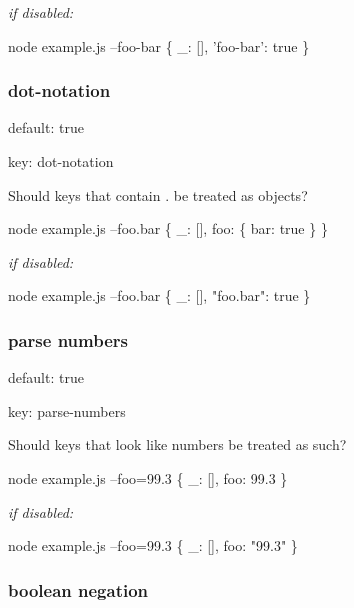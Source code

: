 {\itshape if disabled\+:}


\begin{DoxyCode}
node example.js --foo-bar
\{ \_: [], 'foo-bar': true \}
\end{DoxyCode}


\subsubsection*{dot-\/notation}


\begin{DoxyItemize}
\item default\+: {\ttfamily true}
\item key\+: {\ttfamily dot-\/notation}
\end{DoxyItemize}

Should keys that contain {\ttfamily .} be treated as objects?


\begin{DoxyCode}
node example.js --foo.bar
\{ \_: [], foo: \{ bar: true \} \}
\end{DoxyCode}


{\itshape if disabled\+:}


\begin{DoxyCode}
node example.js --foo.bar
\{ \_: [], "foo.bar": true \}
\end{DoxyCode}


\subsubsection*{parse numbers}


\begin{DoxyItemize}
\item default\+: {\ttfamily true}
\item key\+: {\ttfamily parse-\/numbers}
\end{DoxyItemize}

Should keys that look like numbers be treated as such?


\begin{DoxyCode}
node example.js --foo=99.3
\{ \_: [], foo: 99.3 \}
\end{DoxyCode}


{\itshape if disabled\+:}


\begin{DoxyCode}
node example.js --foo=99.3
\{ \_: [], foo: "99.3" \}
\end{DoxyCode}


\subsubsection*{boolean negation}


